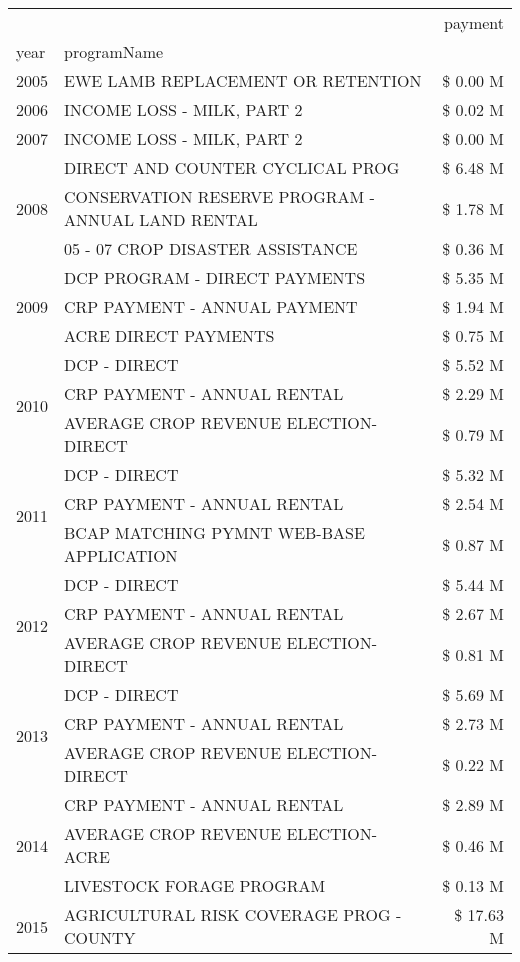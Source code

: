 \begin{tabular}{llr}
\toprule
 &  & payment \\
year & programName &  \\
\midrule
2005 & EWE LAMB REPLACEMENT OR RETENTION & \$ 0.00 M \\
\cline{1-3}
2006 & INCOME LOSS - MILK, PART 2 & \$ 0.02 M \\
\cline{1-3}
2007 & INCOME LOSS - MILK, PART 2 & \$ 0.00 M \\
\cline{1-3}
\multirow[t]{3}{*}{2008} & DIRECT AND COUNTER CYCLICAL PROG & \$ 6.48 M \\
 & CONSERVATION RESERVE PROGRAM - ANNUAL LAND RENTAL & \$ 1.78 M \\
 & 05 - 07 CROP DISASTER ASSISTANCE & \$ 0.36 M \\
\cline{1-3}
\multirow[t]{3}{*}{2009} & DCP PROGRAM - DIRECT PAYMENTS & \$ 5.35 M \\
 & CRP PAYMENT - ANNUAL PAYMENT & \$ 1.94 M \\
 & ACRE DIRECT PAYMENTS & \$ 0.75 M \\
\cline{1-3}
\multirow[t]{3}{*}{2010} & DCP - DIRECT & \$ 5.52 M \\
 & CRP PAYMENT - ANNUAL RENTAL & \$ 2.29 M \\
 & AVERAGE CROP REVENUE ELECTION-DIRECT & \$ 0.79 M \\
\cline{1-3}
\multirow[t]{3}{*}{2011} & DCP - DIRECT & \$ 5.32 M \\
 & CRP PAYMENT - ANNUAL RENTAL & \$ 2.54 M \\
 & BCAP MATCHING PYMNT WEB-BASE APPLICATION & \$ 0.87 M \\
\cline{1-3}
\multirow[t]{3}{*}{2012} & DCP - DIRECT & \$ 5.44 M \\
 & CRP PAYMENT - ANNUAL RENTAL & \$ 2.67 M \\
 & AVERAGE CROP REVENUE ELECTION-DIRECT & \$ 0.81 M \\
\cline{1-3}
\multirow[t]{3}{*}{2013} & DCP - DIRECT & \$ 5.69 M \\
 & CRP PAYMENT - ANNUAL RENTAL & \$ 2.73 M \\
 & AVERAGE CROP REVENUE ELECTION-DIRECT & \$ 0.22 M \\
\cline{1-3}
\multirow[t]{3}{*}{2014} & CRP PAYMENT - ANNUAL RENTAL & \$ 2.89 M \\
 & AVERAGE CROP REVENUE ELECTION-ACRE & \$ 0.46 M \\
 & LIVESTOCK FORAGE PROGRAM & \$ 0.13 M \\
\cline{1-3}
\multirow[t]{3}{*}{2015} & AGRICULTURAL RISK COVERAGE PROG - COUNTY & \$ 17.63 M \\

\end{tabular}
